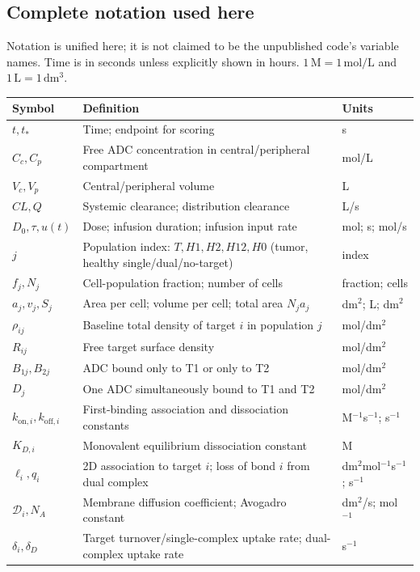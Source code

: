 \documentclass[11pt,a4paper]{article}
\newcommand{\M}{\mathrm{M}}\newcommand{\s}{\mathrm{s}}\newcommand{\dd}{\mathrm{d}}
\begin{document}
\subsection{Complete notation used here}
Notation is unified here; it is not claimed to be the unpublished code's variable names. Time is in seconds unless explicitly shown in hours. $1\,\M=1\,\mathrm{mol/L}$ and $1\,\mathrm{L}=1\,\mathrm{dm^3}$.
\begin{longtable}{p{.22\linewidth}p{.47\linewidth}p{.25\linewidth}}
\toprule Symbol & Definition & Units\\\midrule\endhead
$t,t_*$ & Time; endpoint for scoring & s\\
$C_c,C_p$ & Free ADC concentration in central/peripheral compartment & mol/L\\
$V_c,V_p$ & Central/peripheral volume & L\\
$CL,Q$ & Systemic clearance; distribution clearance & L/s\\
$D_0,\tau,u(t)$ & Dose; infusion duration; infusion input rate & mol; s; mol/s\\
$j$ & Population index: $T,H1,H2,H12,H0$ (tumor, healthy single/dual/no-target) & index\\
$f_j,N_j$ & Cell-population fraction; number of cells & fraction; cells\\
$a_j,v_j,S_j$ & Area per cell; volume per cell; total area $N_ja_j$ & dm$^2$; L; dm$^2$\\
$\rho_{ij}$ & Baseline total density of target $i$ in population $j$ & mol/dm$^2$\\
$R_{ij}$ & Free target surface density & mol/dm$^2$\\
$B_{1j},B_{2j}$ & ADC bound only to T1 or only to T2 & mol/dm$^2$\\
$D_j$ & One ADC simultaneously bound to T1 and T2 & mol/dm$^2$\\
$k_{\mathrm{on},i},k_{\mathrm{off},i}$ & First-binding association and dissociation constants & M$^{-1}$s$^{-1}$; s$^{-1}$\\
$K_{D,i}$ & Monovalent equilibrium dissociation constant & M\\
$\ell_i,q_i$ & 2D association to target $i$; loss of bond $i$ from dual complex & dm$^2$mol$^{-1}$s$^{-1}$; s$^{-1}$\\
$\mathcal D_i,N_A$ & Membrane diffusion coefficient; Avogadro constant & dm$^2$/s; mol$^{-1}$\\
$\delta_i,\delta_D$ & Target turnover/single-complex uptake rate; dual-complex uptake rate & s$^{-1}$\\

\end{longtable}
\end{document}
